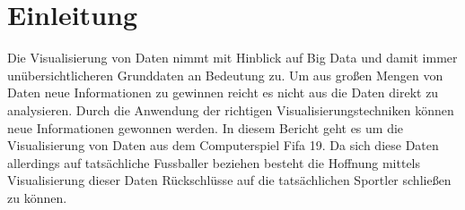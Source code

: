 \documentclass[paper=a4,12pt,titlepage,listof=totoc]{scrartcl}
\begin{document}



{}
\tableofcontents

\clearpage








\section{Einleitung}
Die Visualisierung von Daten nimmt mit Hinblick auf Big Data und damit immer unübersichtlicheren Grunddaten an Bedeutung zu. Um aus großen Mengen von Daten neue Informationen zu gewinnen reicht es nicht aus die Daten direkt zu analysieren. Durch die Anwendung der richtigen Visualisierungstechniken können neue Informationen gewonnen werden. In diesem Bericht geht es um die Visualisierung von Daten aus dem Computerspiel Fifa 19. Da sich diese Daten allerdings auf tatsächliche Fussballer beziehen besteht die Hoffnung mittels Visualisierung dieser Daten Rückschlüsse auf die tatsächlichen Sportler schließen zu können.
\end{document}

